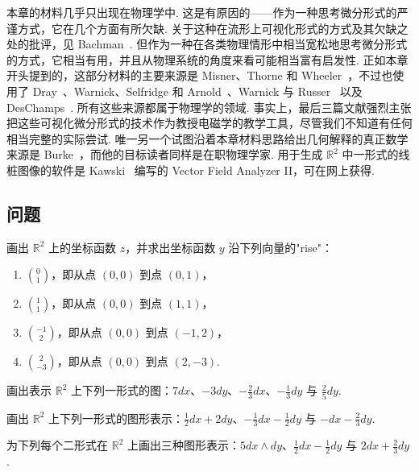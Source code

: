 本章的材料几乎只出现在物理学中. 这是有原因的——作为一种思考微分形式的严谨方式，它在几个方面有所欠缺. 关于这种在流形上可视化形式的方式及其欠缺之处的批评，见 Bachman~\cite{ref04}. 但作为一种在各类物理情形中相当宽松地思考微分形式的方式，它相当有用，并且从物理系统的角度来看可能相当富有启发性. 正如本章开头提到的，这部分材料的主要来源是 Misner、Thorne 和 Wheeler~\cite{ref34}，不过也使用了 Dray~\cite{ref16}、Warnick、Selfridge 和 Arnold~\cite{ref49}、Warnick 与 Russer~\cite{ref48} 以及 DesChamps~\cite{ref13}. 所有这些来源都属于物理学的领域. 事实上，最后三篇文献强烈主张把这些可视化微分形式的技术作为教授电磁学的教学工具，尽管我们不知道有任何相当完整的实际尝试. 唯一另一个试图沿着本章材料思路给出几何解释的真正数学来源是 Burke~\cite{ref08}，而他的目标读者同样是在职物理学家. 用于生成 $\mathbb{R}^2$ 中一形式的线桩图像的软件是 Kawski~\cite{ref28} 编写的 Vector Field Analyzer II，可在网上获得.

\subsection{问题}

\begin{question}\label{q:5-33}
画出 $\mathbb{R}^2$ 上的坐标函数 $z$，并求出坐标函数 $y$ 沿下列向量的"rise"：
\begin{enumerate}
  \item[(a)] $\binom{0}{1}$，即从点 $(0,0)$ 到点 $(0,1)$，
  \item[(b)] $\binom{1}{1}$，即从点 $(0,0)$ 到点 $(1,1)$，
  \item[(c)] $\binom{-1}{2}$，即从点 $(0,0)$ 到点 $(-1,2)$，
  \item[(d)] $\binom{2}{-3}$，即从点 $(0,0)$ 到点 $(2,-3)$.
\end{enumerate}
\end{question}

\begin{question}\label{q:5-34}
画出表示 $\mathbb{R}^2$ 上下列一形式的图：$7dx$、$-3dy$、$-\frac23dx$、$-\frac13dy$ 与 $\frac25dy$.
\end{question}

\begin{question}\label{q:5-35}
画出 $\mathbb{R}^2$ 上下列一形式的图形表示：$\frac12dx+2dy$、$-\frac13dx-\frac12dy$ 与 $-dx-\frac23dy$.
\end{question}

\begin{question}\label{q:5-36}
为下列每个二形式在 $\mathbb{R}^2$ 上画出三种图形表示：$5dx\wedge dy$、$\frac12dx-\frac12dy$ 与 $2dx+\frac23dy$.
\end{question}

